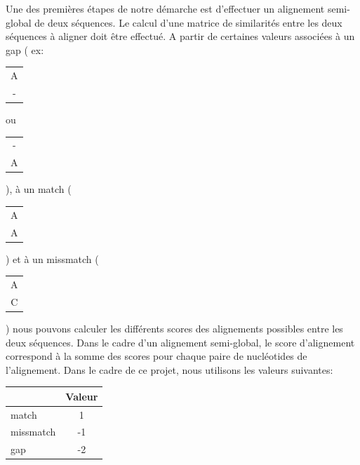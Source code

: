 Une des premières étapes de notre démarche est d'effectuer un alignement semi-global
de deux séquences. Le calcul d'une matrice de similarités entre les deux séquences à aligner doit être effectué. A partir de certaines valeurs associées à un gap ( ex: \begin{tabular}{c} A \\ - \end{tabular} ou \begin{tabular}{c} - \\ A \end{tabular} ), à un match (\begin{tabular}{c} A \\ A \end{tabular}) et à un missmatch (\begin{tabular}{c} A \\ C \end{tabular}) nous pouvons calculer les différents scores des alignements possibles entre les deux séquences. Dans le cadre d'un alignement semi-global, le score d'alignement correspond à la somme des scores pour chaque paire de nucléotides de l'alignement.
Dans le cadre de ce projet, nous utilisons les valeurs suivantes:

\begin{center}
	\begin{tabular}{|l|c|}
		\hline
		 & Valeur \\
		\hline
		\hline
		match & 1 \\
		\hline
	 	missmatch & -1\\
		\hline
		gap &  -2 \\
		\hline
	\end{tabular}
\end{center}





